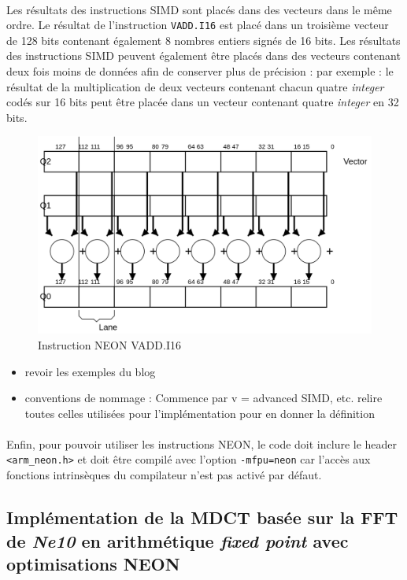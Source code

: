 \documentclass{article}
\begin{document}
    \paragraph{}
    Les résultats des instructions SIMD sont placés dans des vecteurs dans le même ordre. Le résultat de l'instruction \texttt{VADD.I16} est placé dans un troisième vecteur de 128 bits contenant également 8 nombres entiers signés de 16 bits. Les résultats des instructions SIMD peuvent également être placés dans des vecteurs contenant deux fois moins de données afin de conserver plus de précision : par exemple : le résultat de la multiplication de deux vecteurs contenant chacun quatre \emph{integer} codés sur 16 bits peut être placée dans un vecteur contenant quatre \emph{integer} en 32 bits.

    \begin{figure}[H]
        \centering
        \includegraphics[width=.6\linewidth]{./images/vadd-i16.png}
        \caption{Instruction NEON VADD.I16}
        \label{fig:neon-example}
    \end{figure}



    \begin{itemize}
        \item revoir les exemples du blog
        \item conventions de nommage : Commence par v = advanced SIMD, etc. relire toutes celles utilisées pour l'implémentation pour en donner la définition
    \end{itemize}


    \paragraph{}
    Enfin, pour pouvoir utiliser les instructions NEON, le code doit inclure le header \texttt{<arm\_neon.h>} et doit être compilé avec l'option \texttt{-mfpu=neon} car l'accès aux fonctions intrinsèques du compilateur n'est pas activé par défaut.


    \subsection{Implémentation de la MDCT basée sur la FFT de \emph{Ne10} en arithmétique \emph{fixed point} avec optimisations NEON}
\end{document}
